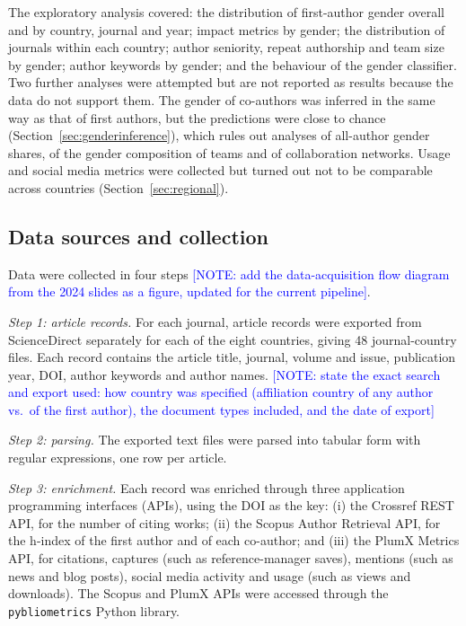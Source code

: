 \documentclass[preprint,12pt,number]{elsarticle}
\newcommand{\note}[1]{\textcolor{blue}{[NOTE: #1]}}
\begin{document}
The exploratory analysis covered: the distribution of first-author gender overall and by country, journal and year; impact metrics by gender; the distribution of journals within each country; author seniority, repeat authorship and team size by gender; author keywords by gender; and the behaviour of the gender classifier. Two further analyses were attempted but are not reported as results because the data do not support them. The gender of co-authors was inferred in the same way as that of first authors, but the predictions were close to chance (Section~\ref{sec:genderinference}), which rules out analyses of all-author gender shares, of the gender composition of teams and of collaboration networks. Usage and social media metrics were collected but turned out not to be comparable across countries (Section~\ref{sec:regional}).

\subsection{Data sources and collection}

Data were collected in four steps \note{add the data-acquisition flow diagram from the 2024 slides as a figure, updated for the current pipeline}.

\textit{Step 1: article records.} For each journal, article records were exported from ScienceDirect separately for each of the eight countries, giving 48 journal-country files. Each record contains the article title, journal, volume and issue, publication year, DOI, author keywords and author names. \note{state the exact search and export used: how country was specified (affiliation country of any author vs.\ of the first author), the document types included, and the date of export}

\textit{Step 2: parsing.} The exported text files were parsed into tabular form with regular expressions, one row per article.

\textit{Step 3: enrichment.} Each record was enriched through three application programming interfaces (APIs), using the DOI as the key: (i) the Crossref REST API, for the number of citing works; (ii) the Scopus Author Retrieval API, for the h-index of the first author and of each co-author; and (iii) the PlumX Metrics API, for citations, captures (such as reference-manager saves), mentions (such as news and blog posts), social media activity and usage (such as views and downloads). The Scopus and PlumX APIs were accessed through the \texttt{pybliometrics} Python library.
\end{document}
